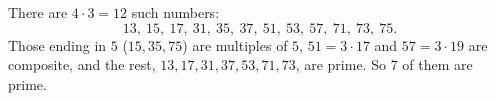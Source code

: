 There are $4\cdot3=12$ such numbers:
\[
13,\ 15,\ 17,\ 31,\ 35,\ 37,\ 51,\ 53,\ 57,\ 71,\ 73,\ 75 .
\]
Those ending in $5$ ($15,35,75$) are multiples of $5$, $51=3\cdot17$ and $57=3\cdot19$ are composite, and the rest, $13,17,31,37,53,71,73$, are prime. So $\boxed{7}$ of them are prime.
